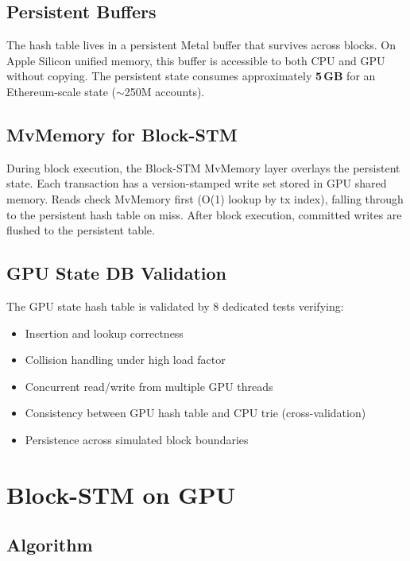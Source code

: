 \documentclass[11pt]{article}
\begin{document}
\subsection{Persistent Buffers}

The hash table lives in a persistent Metal buffer that survives across blocks.
On Apple Silicon unified memory, this buffer is accessible to both CPU and GPU without
copying. The persistent state consumes approximately \textbf{5\,GB} for an Ethereum-scale
state ($\sim$250M accounts).

\subsection{MvMemory for Block-STM}

During block execution, the Block-STM MvMemory layer overlays the persistent state.
Each transaction has a version-stamped write set stored in GPU shared memory. Reads
check MvMemory first (O(1) lookup by tx index), falling through to the persistent hash
table on miss. After block execution, committed writes are flushed to the persistent table.

\subsection{GPU State DB Validation}

The GPU state hash table is validated by 8 dedicated tests verifying:
\begin{itemize}
\item Insertion and lookup correctness
\item Collision handling under high load factor
\item Concurrent read/write from multiple GPU threads
\item Consistency between GPU hash table and CPU trie (cross-validation)
\item Persistence across simulated block boundaries
\end{itemize}

\section{Block-STM on GPU}
\label{sec:blockstm}

\subsection{Algorithm}
\end{document}
